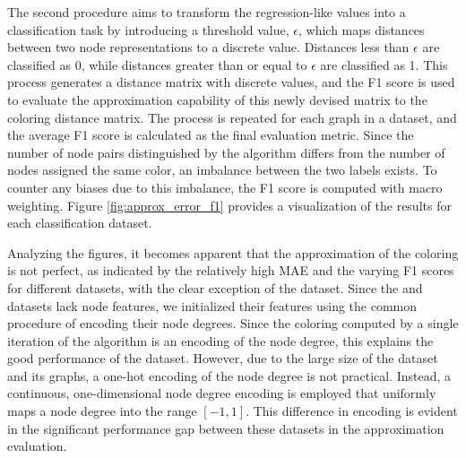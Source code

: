The second procedure aims to transform the regression-like values into a classification task by introducing a threshold value, $\epsilon$, which maps distances between two node representations to a discrete value. Distances less than $\epsilon$ are classified as 0, while distances greater than or equal to $\epsilon$ are classified as 1. This process generates a distance matrix with discrete values, and the F1 score is used to evaluate the approximation capability of this newly devised matrix to the \wl coloring distance matrix. The process is repeated for each graph in a dataset, and the average F1 score is calculated as the final evaluation metric. Since the number of node pairs distinguished by the \wl algorithm differs from the number of nodes assigned the same color, an imbalance between the two labels exists. To counter any biases due to this imbalance, the F1 score is computed with macro weighting. Figure \ref{fig:approx_error_f1} provides a visualization of the results for each classification dataset.

Analyzing the figures, it becomes apparent that the approximation of the \wl coloring is not perfect, as indicated by the relatively high MAE and the varying F1 scores for different datasets, with the clear exception of the \imdb dataset. Since the \imdb and \reddit datasets lack node features, we initialized their features using the common procedure of encoding their node degrees. Since the coloring computed by a single iteration of the \wl algorithm is an encoding of the node degree, this explains the good performance of the \imdb dataset. However, due to the large size of the \reddit dataset and its graphs, a one-hot encoding of the node degree is not practical. Instead, a continuous, one-dimensional node degree encoding is employed that uniformly maps a node degree into the range $[-1, 1]$. This difference in encoding is evident in the significant performance gap between these datasets in the approximation evaluation.

